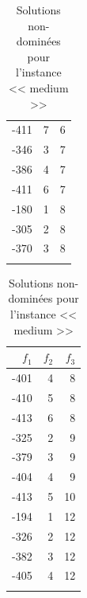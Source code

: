 \documentclass[12pt, a4paper, french, version=last, parskip=half, titlepage]{scrartcl}
\begin{document}
\begin{table}[H]
\begin{tabular}{r r r}
        -411 & 7 & 6 \\
        -346 & 3 & 7 \\
        -386 & 4 & 7 \\
        -411 & 6 & 7 \\
        -180 & 1 & 8 \\
        -305 & 2 & 8 \\
        -370 & 3 & 8 \\
        \bottomrule\\
    \end{tabular}
    \hspace*{1cm}
    \begin{tabular}{r r r}
        \toprule
        $f_1$ & $f_2$ & $f_3$ \\
        \midrule
        -401 & 4 & 8 \\
        -410 & 5 & 8 \\
        -413 & 6 & 8 \\
        -325 & 2 & 9 \\
        -379 & 3 & 9 \\
        -404 & 4 & 9 \\
        -413 & 5 & 10 \\
        -194 & 1 & 12 \\
        -326 & 2 & 12 \\
        -382 & 3 & 12 \\
        -405 & 4 & 12 \\
        \bottomrule\\
    \end{tabular}
    \caption{Solutions non-dominées pour l'instance << medium >>}
\end{table}
\end{document}
